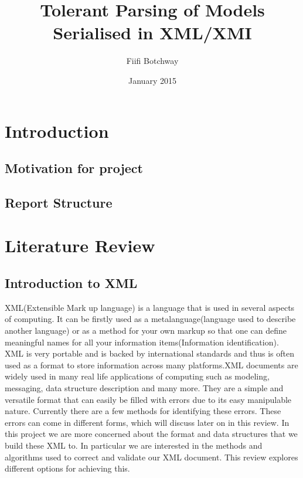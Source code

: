\documentclass{report}
\title{Tolerant Parsing of Models Serialised in XML/XMI}
\author{Fiifi Botchway}
\date{January 2015}
\begin{document}
\maketitle


\chapter{Introduction}
\section{Motivation for project}
\section{Report Structure}



\chapter{Literature Review}
\section{Introduction to XML}

XML(Extensible Mark up language) is a language that is used in several aspects of computing. It can be firstly used as a metalanguage(language used to describe another language) or as a method for your own markup so that one can define meaningful names for all your information items(Information identification). XML is very portable and is backed by international standards and thus is often used as a format to store information across many platforms.XML documents are widely used in many real life applications of computing such as modeling, messaging, data structure description and many more. They are a simple and versatile format that can easily be filled with errors due to its easy manipulable nature. Currently there are a few methods for identifying these errors. These errors can come in different forms, which will discuss later on in this review. In this project we are more concerned about the format and data structures that we build these XML to. In particular we are interested in the methods and algorithms used to correct and validate our XML document. This review explores different options for achieving this.
\end{document}
